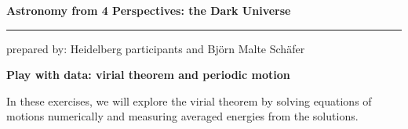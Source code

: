 \documentclass[a4paper,12pt]{article}
\newcommand{\HRule}{\rule{\linewidth}{0.3mm}}
\begin{document}
\pagestyle{empty}

\begin{center}
\LARGE \textbf{Astronomy from 4 Perspectives: the Dark Universe}
\HRule
\end{center}
\begin{flushright}
prepared by: Heidelberg participants and Bj{\"o}rn Malte Sch{\"a}fer
\end{flushright}
\begin{center}
{\Large \textbf{Play with data: virial theorem and periodic motion}}
\end{center}
\vspace{5mm}

\noindent
In these exercises, we will explore the virial theorem by solving equations of motions numerically and measuring averaged energies from the solutions.
\end{document}
